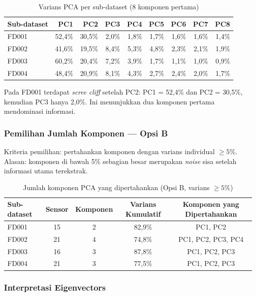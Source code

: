 \documentclass[11pt,a4paper]{article}
\begin{document}
\begin{table}[H]
\centering\small
\caption{Varians PCA per sub-dataset (8 komponen pertama)}
\label{tab:pca_variance}
\begin{tabular}{lrrrrrrrr}
\toprule
Sub-dataset & PC1 & PC2 & PC3 & PC4 & PC5 & PC6 & PC7 & PC8 \\
\midrule
FD001 & 52,4\% & 30,5\% & 2,0\% & 1,8\% & 1,7\% & 1,6\% & 1,6\% & 1,4\% \\
FD002 & 41,6\% & 19,5\% & 8,4\% & 5,3\% & 4,8\% & 2,3\% & 2,1\% & 1,9\% \\
FD003 & 60,2\% & 20,4\% & 7,2\% & 3,9\% & 1,7\% & 1,1\% & 1,0\% & 0,9\% \\
FD004 & 48,4\% & 20,9\% & 8,1\% & 4,3\% & 2,7\% & 2,4\% & 2,0\% & 1,7\% \\
\bottomrule
\end{tabular}
\end{table}

Pada FD001 terdapat \textit{scree cliff} setelah PC2: PC1 = 52,4\% dan
PC2 = 30,5\%, kemudian PC3 hanya 2,0\%. Ini menunjukkan dua komponen pertama
mendominasi informasi.

\subsubsection{Pemilihan Jumlah Komponen --- Opsi B}

Kriteria pemilihan: pertahankan komponen dengan varians individual $\geq 5\%$.
Alasan: komponen di bawah 5\% sebagian besar merupakan \textit{noise} sisa
setelah informasi utama terekstrak.

\begin{table}[H]
\centering\small
\caption{Jumlah komponen PCA yang dipertahankan (Opsi B, varians $\geq 5\%$)}
\label{tab:pca_kept}
\begin{tabular}{lcccc}
\toprule
Sub-dataset & Sensor & Komponen & Varians Kumulatif & Komponen yang Dipertahankan \\
\midrule
FD001 & 15 & 2 & 82,9\% & PC1, PC2 \\
FD002 & 21 & 4 & 74,8\% & PC1, PC2, PC3, PC4 \\
FD003 & 16 & 3 & 87,8\% & PC1, PC2, PC3 \\
FD004 & 21 & 3 & 77,5\% & PC1, PC2, PC3 \\
\bottomrule
\end{tabular}
\end{table}

\subsubsection{Interpretasi Eigenvectors}
\end{document}
